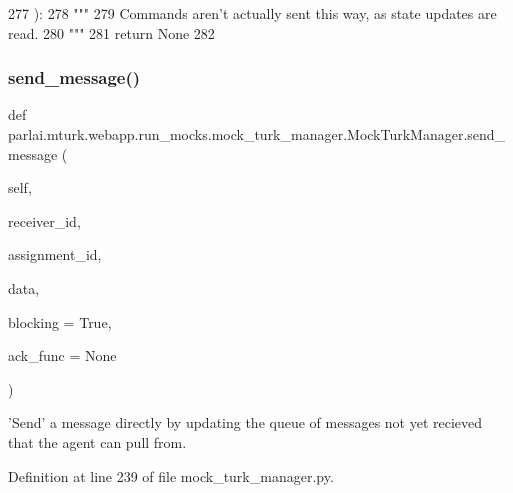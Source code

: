\begin{DoxyCode}
277     ):
278         \textcolor{stringliteral}{"""}
279 \textcolor{stringliteral}{        Commands aren't actually sent this way, as state updates are read.}
280 \textcolor{stringliteral}{        """}
281         \textcolor{keywordflow}{return} \textcolor{keywordtype}{None}
282 
\end{DoxyCode}
\mbox{\label{classparlai_1_1mturk_1_1webapp_1_1run__mocks_1_1mock__turk__manager_1_1MockTurkManager_a26e2b49cb461535a059fb6d544a8eaab}} 
\subsubsection{\texorpdfstring{send\+\_\+message()}{send\_message()}}
{\footnotesize\ttfamily def parlai.\+mturk.\+webapp.\+run\+\_\+mocks.\+mock\+\_\+turk\+\_\+manager.\+Mock\+Turk\+Manager.\+send\+\_\+message (\begin{DoxyParamCaption}\item[{}]{self,  }\item[{}]{receiver\+\_\+id,  }\item[{}]{assignment\+\_\+id,  }\item[{}]{data,  }\item[{}]{blocking = {\ttfamily True},  }\item[{}]{ack\+\_\+func = {\ttfamily None} }\end{DoxyParamCaption})}

\begin{DoxyVerb}'Send' a message directly by updating the queue of messages not yet recieved
that the agent can pull from.
\end{DoxyVerb}
 

Definition at line 239 of file mock\+\_\+turk\+\_\+manager.\+py.


